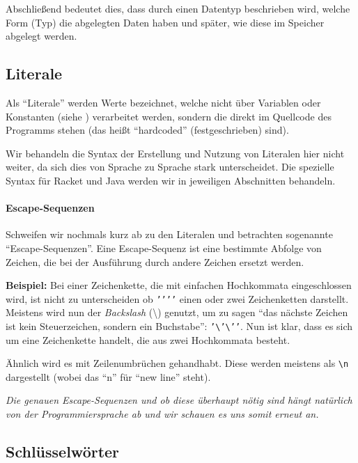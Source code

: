 	Abschließend bedeutet dies, dass durch einen Datentyp beschrieben wird, welche Form (Typ) die abgelegten Daten haben und später, wie diese im Speicher abgelegt werden.

\subsection{Literale} \functionalMark \imperativeMark \oopMark
	
	Als \enquote{Literale} werden Werte bezeichnet, welche nicht über Variablen oder Konstanten (siehe ) verarbeitet werden, sondern die direkt im Quellcode des Programms stehen (das heißt \enquote{hardcoded} (festgeschrieben) sind).
	
	Wir behandeln die Syntax der Erstellung und Nutzung von Literalen hier nicht weiter, da sich dies von Sprache zu Sprache stark unterscheidet. Die spezielle Syntax für Racket und Java werden wir in jeweiligen Abschnitten behandeln.
	
	\paragraph{Escape-Sequenzen}
		Schweifen wir nochmals kurz ab zu den Literalen und betrachten sogenannte \enquote{Escape-Sequenzen}. Eine Escape-Sequenz ist eine bestimmte Abfolge von Zeichen, die bei der Ausführung durch andere Zeichen ersetzt werden.
		
		\textbf{Beispiel:} Bei einer Zeichenkette, die mit einfachen Hochkommata eingeschlossen wird, ist nicht zu unterscheiden ob \texttt{'{}'{}'{}'} einen oder zwei Zeichenketten darstellt. Meistens wird nun der \textit{Backslash} (\textbackslash) genutzt,
		um zu sagen \enquote{das nächste Zeichen ist kein Steuerzeichen, sondern ein Buchstabe}: \texttt{'\textbackslash'\textbackslash'{}'}. Nun ist klar, dass es sich um eine Zeichenkette handelt, die aus zwei Hochkommata besteht.
		
		Ähnlich wird es mit Zeilenumbrüchen gehandhabt. Diese werden meistens als \texttt{\textbackslash n} dargestellt (wobei das \enquote{n} für \enquote{new line} steht).
		
		\textit{Die genauen Escape-Sequenzen und ob diese überhaupt nötig sind hängt natürlich von der Programmiersprache ab und wir schauen es uns somit erneut an.}

\subsection{Schlüsselwörter} \functionalMark \imperativeMark \oopMark
	
